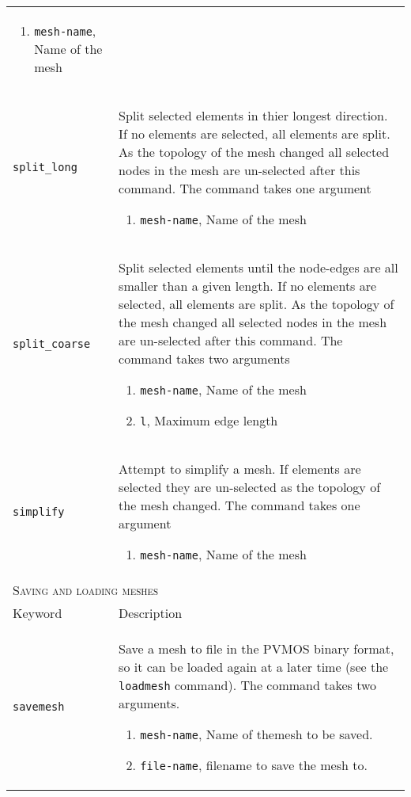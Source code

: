 \documentclass[noshowpacs,preprintnumbers,amsmath,amssymb, letter]{revtex4}
\begin{document}
\begin{longtable}{p{}p{}}
\begin{enumerate}
\item \texttt{mesh-name}, Name of the mesh
\end{enumerate}\\
\texttt{split\_long}	& Split selected elements in thier longest direction. If no elements are selected, all elements are split. As the topology of the mesh changed all selected nodes in the mesh are un-selected after this command. The command takes one argument 
\begin{enumerate}
\item \texttt{mesh-name}, Name of the mesh
\end{enumerate}\\
\texttt{split\_coarse}	& Split selected elements until the node-edges are all smaller than a given length. If no elements are selected, all elements are split. As the topology of the mesh changed all selected nodes in the mesh are un-selected after this command. The command takes two arguments 
\begin{enumerate}
\item \texttt{mesh-name}, Name of the mesh
\item \texttt{l}, Maximum edge length
\end{enumerate}\\
\texttt{simplify}	&  Attempt to simplify a mesh. If elements are selected they are un-selected as the topology of the mesh changed. The command takes one argument 
\begin{enumerate}
\item \texttt{mesh-name}, Name of the mesh
\end{enumerate}\\
\multicolumn{2}{l}{\textsc{Saving and loading meshes}} \\*
\hline
Keyword & Description \\
\texttt{savemesh}	& Save a mesh to file in the PVMOS binary format, so it can be loaded again at a later time (see the \texttt{loadmesh} command). The command takes two arguments.
\begin{enumerate}
\item \texttt{mesh-name}, Name of themesh to be saved.
\item \texttt{file-name}, filename to save the mesh to.

\end{enumerate}
\end{longtable}
\end{document}
